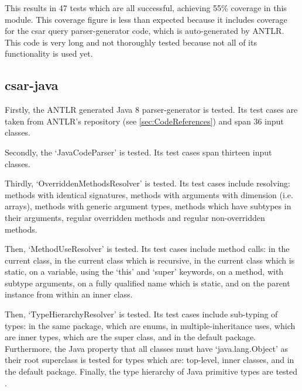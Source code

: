 \documentclass[12pt, letterpaper]{article}
\begin{document}
This results in 47 tests which are all successful, achieving 55\% coverage in this module.
This coverage figure is less than expected because it includes coverage for the csar query parser-generator code, which is auto-generated by ANTLR.
This code is very long and not thoroughly tested because not all of its functionality is used yet.

\subsection{csar-java}
Firstly, the ANTLR generated Java 8 parser-generator is tested.
Its test cases are taken from ANTLR's repository (see \ref{sec:CodeReferences}) and span 36 input classes.

Secondly, the `JavaCodeParser' is tested.
Its test cases span thirteen input classes.

Thirdly, `OverriddenMethodsResolver' is tested.
Its test cases include resolving: methods with identical signatures, methods with arguments with dimension (i.e. arrays), methods with generic argument types, methods which have subtypes in their arguments, regular overridden methods and regular non-overridden methods.

Then, `MethodUseResolver' is tested.
Its test cases include method calls: in the current class, in the current class which is recursive, in the current class which is static, on a variable, using the `this' and `super' keywords, on a method, with subtype arguments, on a fully qualified name which is static, and on the parent instance from within an inner class.

Then, `TypeHierarchyResolver' is tested.
Its test cases include sub-typing of types: in the same package, which are enums, in multiple-inheritance uses, which are inner types, which are the super class, and in the default package.
Furthermore, the Java property that all classes must have `java.lang.Object' as their root superclass is tested for types which are: top-level, inner classes, and in the default package.
Finally, the type hierarchy of Java primitive types are tested \autocite{javadocsnumber}.
\end{document}
